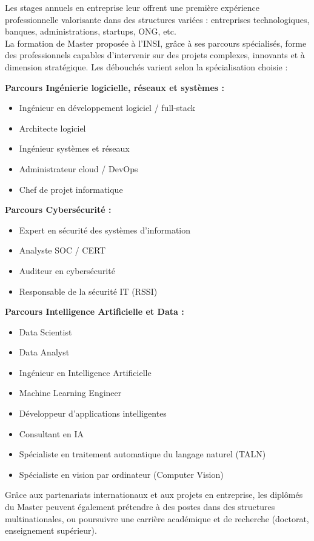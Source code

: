 \documentclass[a4paper,12pt]{article}
\begin{document}
Les stages annuels en entreprise leur offrent une première expérience professionnelle valorisante dans des structures variées : entreprises technologiques, banques, administrations, startups, ONG, etc.\\

La formation de Master proposée à l’INSI, grâce à ses parcours spécialisés, forme des professionnels capables d’intervenir sur des projets complexes, innovants et à dimension stratégique. Les débouchés varient selon la spécialisation choisie :

\textbf{Parcours Ingénierie logicielle, réseaux et systèmes :}
\begin{itemize}
    \item Ingénieur en développement logiciel / full-stack
    \item Architecte logiciel
    \item Ingénieur systèmes et réseaux
    \item Administrateur cloud / DevOps
    \item Chef de projet informatique
\end{itemize}

\textbf{Parcours Cybersécurité :}
\begin{itemize}
    \item Expert en sécurité des systèmes d'information
    \item Analyste SOC / CERT
    \item Auditeur en cybersécurité
    \item Responsable de la sécurité IT (RSSI)
\end{itemize}

\textbf{Parcours Intelligence Artificielle et Data :}
\begin{itemize}
    \item Data Scientist
    \item Data Analyst
    \item Ingénieur en Intelligence Artificielle
    \item Machine Learning Engineer
    \item Développeur d'applications intelligentes
    \item Consultant en IA
    \item Spécialiste en traitement automatique du langage naturel (TALN)
    \item Spécialiste en vision par ordinateur (Computer Vision)
\end{itemize}

Grâce aux partenariats internationaux et aux projets en entreprise, les diplômés du Master peuvent également prétendre à des postes dans des structures multinationales, ou poursuivre une carrière académique et de recherche (doctorat, enseignement supérieur).\\
\end{document}
